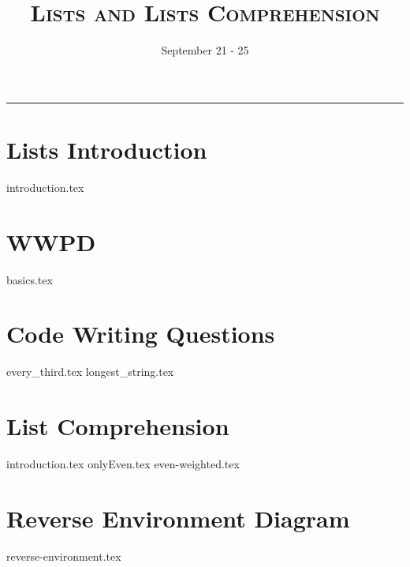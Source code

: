 \documentclass{exam}
\title{\textsc{Lists and Lists Comprehension}}
\date{September 21 - 25}
\begin{document}
\maketitle
\rule{\textwidth}{0.15em}
\fontsize{12}{15}\selectfont



\vspace{-1em}
\section{Lists Introduction}
{introduction.tex}

\newpage
\section{WWPD}
{basics.tex}

\newpage
\section{Code Writing Questions}
{every_third.tex}
{longest_string.tex}

\newpage
\section{List Comprehension}
{introduction.tex}
\newpage
{onlyEven.tex}
{even-weighted.tex}

\newpage
\section{Reverse Environment Diagram}
{reverse-environment.tex}
\end{document}
